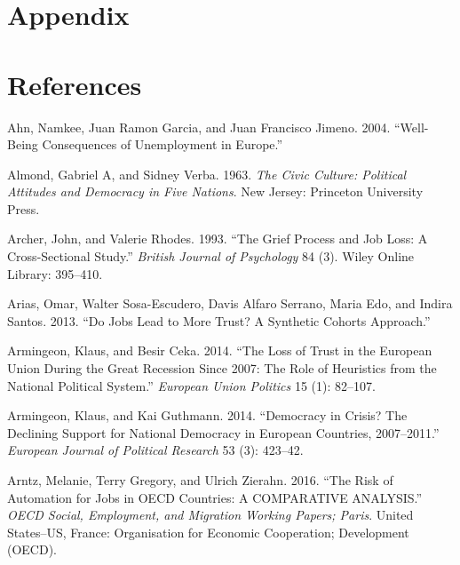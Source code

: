 \documentclass[12pt,]{article}
\begin{document}
\newpage

\hypertarget{sec:appendix}{%
\section{Appendix}\label{sec:appendix}}







\normalsize

\clearpage

\hypertarget{references}{%
\section*{References}\label{references}}

\hypertarget{refs}{}
\leavevmode\hypertarget{ref-Ahn2004-mg}{}%
Ahn, Namkee, Juan Ramon Garcia, and Juan Francisco Jimeno. 2004. ``Well-Being Consequences of Unemployment in Europe.''

\leavevmode\hypertarget{ref-Almond1963-bp}{}%
Almond, Gabriel A, and Sidney Verba. 1963. \emph{The Civic Culture: Political Attitudes and Democracy in Five Nations}. New Jersey: Princeton University Press.

\leavevmode\hypertarget{ref-Archer1993-bq}{}%
Archer, John, and Valerie Rhodes. 1993. ``The Grief Process and Job Loss: A Cross-Sectional Study.'' \emph{British Journal of Psychology} 84 (3). Wiley Online Library: 395--410.

\leavevmode\hypertarget{ref-Arias2013-px}{}%
Arias, Omar, Walter Sosa-Escudero, Davis Alfaro Serrano, Maria Edo, and Indira Santos. 2013. ``Do Jobs Lead to More Trust? A Synthetic Cohorts Approach.''

\leavevmode\hypertarget{ref-Armingeon2014-ut}{}%
Armingeon, Klaus, and Besir Ceka. 2014. ``The Loss of Trust in the European Union During the Great Recession Since 2007: The Role of Heuristics from the National Political System.'' \emph{European Union Politics} 15 (1): 82--107.

\leavevmode\hypertarget{ref-Armingeon2014-xg}{}%
Armingeon, Klaus, and Kai Guthmann. 2014. ``Democracy in Crisis? The Declining Support for National Democracy in European Countries, 2007--2011.'' \emph{European Journal of Political Research} 53 (3): 423--42.

\leavevmode\hypertarget{ref-Arntz2016-od}{}%
Arntz, Melanie, Terry Gregory, and Ulrich Zierahn. 2016. ``The Risk of Automation for Jobs in OECD Countries: A COMPARATIVE ANALYSIS.'' \emph{OECD Social, Employment, and Migration Working Papers; Paris}. United States--US, France: Organisation for Economic Cooperation; Development (OECD).
\end{document}
